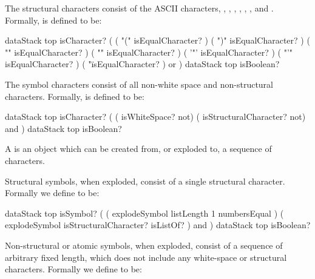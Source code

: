 
The structural characters consist of the ASCII characters, \quote{(}, 
\quote{)}, \quote{\{}, \quote{\}}, , , and 
\quote{\textbackslash}. Formally, 
 is defined to be: 

\starttyping
{ dataStack top isCharacter? }
(
  ( "(" isEqualCharacter? )
  ( ")" isEqualCharacter? )
  ( "{" isEqualCharacter? )
  ( "}" isEqualCharacter? )
  ( '"' isEqualCharacter? )
  ( "'" isEqualCharacter? )
  ( "\" isEqualCharacter? )
  or
)
{ dataStack top isBoolean? }

\stoptyping

The symbol characters consist of all non-white space and non-structural 
characters. Formally,  is defined to 
be: 

\starttyping
{ dataStack top isCharacter? }
(
  ( isWhiteSpace? not)
  ( isStructuralCharacter? not)
  and
)
{ dataStack top isBoolean? }
\stoptyping

\stopDefinition

\subChapterAppendix[title=Symbols, reference=symbolSpec]


\startDefinition 

A  is an object which can be created from, or exploded to, 
a sequence of characters. 

Structural symbols, when exploded, consist of a single structural 
character. Formally we define  to 
be: 

\starttyping
{ dataStack top isSymbol? }
(
  ( explodeSymbol listLength 1 numbersEqual )
  ( explodeSymbol isStructuralCharacter? isListOf? )
  and
)
{ dataStack top isBoolean? }
\stoptyping

Non-structural or atomic symbols, when exploded, consist of a sequence of 
arbitrary fixed length, which does not include any white-space or 
structural characters. Formally we define 
 to be: 

